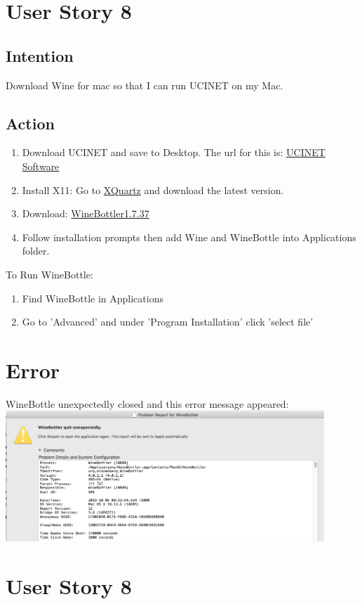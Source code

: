 \documentclass{article}
\begin{document}
\section{User Story 8}
\subsection{Intention}
Download Wine for mac so that I can run UCINET on my Mac. 
\subsection{Action}
\begin{enumerate}
\item Download UCINET and save to Desktop. The url for this is: \href{https://sites.google.com/site/ucinetsoftware/downloads}{UCINET Software}
\item Install X11: Go to \href{https://www.xquartz.org}{XQuartz} and download the latest version. 
    \item Download: \href{http://winebottler.kronenberg.org}{WineBottler1.7.37} 
    \item Follow installation prompts then add Wine and WineBottle into Applications folder.
\end{enumerate}
To Run WineBottle:
\begin{enumerate}
    \item Find WineBottle in Applications
    \item Go to 'Advanced' and under 'Program Installation' click 'select file'
\end{enumerate}
\section{Error}
WineBottle unexpectedly closed and this error message appeared:\\
\includegraphics[width=12cm]{WineBottle.png}

\section{User Story 8}
\end{document}
